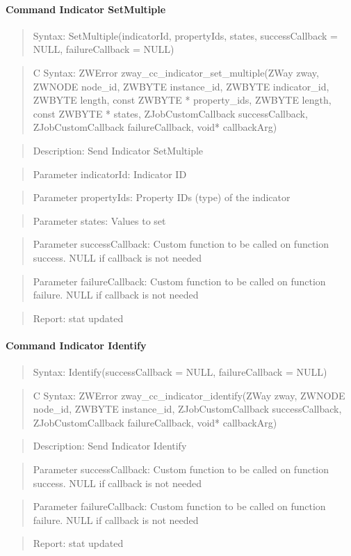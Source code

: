 \paragraph{Command Indicator SetMultiple}
\begin{quote}Syntax: SetMultiple(indicatorId, propertyIds, states, successCallback = NULL, failureCallback = NULL)\end{quote}
\begin{quote}C Syntax: ZWError zway\_cc\_indicator\_set\_multiple(ZWay zway, ZWNODE node\_id, ZWBYTE instance\_id, ZWBYTE indicator\_id, ZWBYTE length, const ZWBYTE * property\_ids, ZWBYTE length, const ZWBYTE * states, ZJobCustomCallback successCallback, ZJobCustomCallback failureCallback, void* callbackArg)\end{quote}
\begin{quote}Description: Send Indicator SetMultiple\end{quote}
\begin{quote}Parameter indicatorId: Indicator ID\end{quote}
\begin{quote}Parameter propertyIds: Property IDs (type) of the indicator\end{quote}
\begin{quote}Parameter states: Values to set\end{quote}
\begin{quote}Parameter successCallback: Custom function to be called on function success. NULL if callback is not needed\end{quote}
\begin{quote}Parameter failureCallback: Custom function to be called on function failure. NULL if callback is not needed\end{quote}
\begin{quote}Report: stat updated\end{quote}

\paragraph{Command Indicator Identify}
\begin{quote}Syntax: Identify(successCallback = NULL, failureCallback = NULL)\end{quote}
\begin{quote}C Syntax: ZWError zway\_cc\_indicator\_identify(ZWay zway, ZWNODE node\_id, ZWBYTE instance\_id, ZJobCustomCallback successCallback, ZJobCustomCallback failureCallback, void* callbackArg)\end{quote}
\begin{quote}Description: Send Indicator Identify\end{quote}
\begin{quote}Parameter successCallback: Custom function to be called on function success. NULL if callback is not needed\end{quote}
\begin{quote}Parameter failureCallback: Custom function to be called on function failure. NULL if callback is not needed\end{quote}
\begin{quote}Report: stat updated\end{quote}


